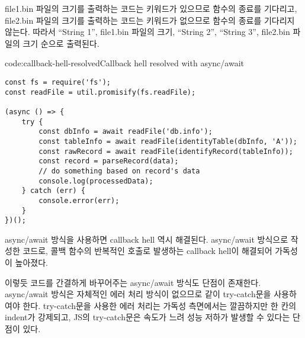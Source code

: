 file1.bin 파일의 크기를 출력하는 코드는  키워드가 있으므로  함수의 종료를 기다리고, file2.bin 파일의 크기를 출력하는 코드는  키워드가 없으므로 함수의 종료를 기다리지 않는다. 따라서 ``String 1'', file1.bin 파일의 크기, ``String 2'', ``String 3'', file2.bin 파일의 크기 순으로 출력된다.

\begin{code}{code:callback-hell-resolved}{Callback hell resolved with async/await}
\begin{verbatim}
const fs = require('fs');
const readFile = util.promisify(fs.readFile);

(async () => {
    try {
        const dbInfo = await readFile('db.info');
        const tableInfo = await readFile(identityTable(dbInfo, 'A'));
        const rawRecord = await readFile(identifyRecord(tableInfo));
        const record = parseRecord(data);
        // do something based on record's data
        console.log(processedData);
    } catch (err) {
        console.error(err);
    }
})();
\end{verbatim}
\end{code}

async/await 방식을 사용하면 callback hell 역시 해결된다. \는 \을 async/await 방식으로 작성한 코드로, 콜백 함수의 반복적인 호출로 발생하는 callback hell이 해결되어 가독성이 높아졌다.

이렇듯 코드를 간결하게 바꾸어주는 async/await 방식도 단점이 존재한다. async/await 방식은 자체적인 에러 처리 방식이 없으므로 \과 같이 try-catch문을 사용하여야 한다. try-catch문을 사용한 에러 처리는 가독성 측면에서는 깔끔하지만 한 칸의 indent가 강제되고, JS의 try-catch문은 속도가 느려 성능 저하가 발생할 수 있다는 단점이 있다.
